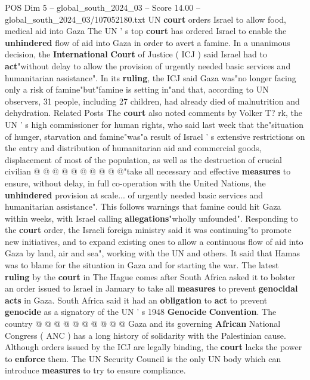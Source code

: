 \begin{textsample}{POS Dim 5 – global\_south\_2024\_03 – Score 14.00 – global\_south\_2024\_03/107052180.txt}  \label{ex:f5_pos_143}
UN \textbf{court} orders Israel to allow food, medical aid into Gaza The UN ' s top \textbf{court} has ordered Israel to enable the \textbf{unhindered} flow of aid into Gaza in order to avert a famine.
In a unanimous decision, the \textbf{International} \textbf{Court} of Justice ( ICJ ) said Israel had to \textbf{act}"without delay to allow the provision of urgently needed basic services and humanitarian assistance".
In its \textbf{ruling}, the ICJ said Gaza was"no longer facing only a risk of famine"but"famine is setting in"and that, according to UN observers, 31 people, including 27 children, had already died of malnutrition and dehydration.
Related Posts The \textbf{court} also noted comments by Volker T? rk, the UN ' s high commissioner for human rights, who said last week that the"situation of hunger, starvation and famine"was"a result of Israel ' s extensive restrictions on the entry and distribution of humanitarian aid and commercial goods, displacement of most of the population, as well as the destruction of crucial civilian @ @ @ @ @ @ @ @ @ @"take all necessary and effective \textbf{measures} to ensure, without delay, in full co-operation with the United Nations, the \textbf{unhindered} provision at scale... of urgently needed basic services and humanitarian assistance".
This follows warnings that famine could hit Gaza within weeks, with Israel calling \textbf{allegations}"wholly unfounded".
Responding to the \textbf{court} order, the Israeli foreign ministry said it was continuing"to promote new initiatives, and to expand existing ones to allow a continuous flow of aid into Gaza by land, air and sea", working with the UN and others.
It said that Hamas was to blame for the situation in Gaza and for starting the war.
The latest \textbf{ruling} by the \textbf{court} in The Hague comes after South Africa asked it to bolster an order issued to Israel in January to take all \textbf{measures} to prevent \textbf{genocidal} \textbf{acts} in Gaza.
South Africa said it had an \textbf{obligation} to \textbf{act} to prevent \textbf{genocide} as a signatory of the UN ' s 1948 \textbf{Genocide} \textbf{Convention}.
The country @ @ @ @ @ @ @ @ @ @ Gaza and its governing \textbf{African} National Congress ( ANC ) has a long history of solidarity with the Palestinian cause.
Although orders issued by the ICJ are legally binding, the \textbf{court} lacks the power to \textbf{enforce} them.
The UN Security Council is the only UN body which can introduce \textbf{measures} to try to ensure compliance.

\end{textsample}
